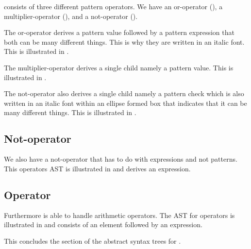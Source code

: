 \productname{} consists of three different pattern operators. We have an or-operator (), a multiplier-operator (), and a not-operator (). 

The or-operator derives a pattern value followed by a pattern expression that both can be many different things. This is why they are written in an italic font. This is illustrated in .



The multiplier-operator derives a single child namely a pattern value. This is illustrated in .



The not-operator also derives a single child namely a pattern check which is also written in an italic font within an ellipse formed box that indicates that it can be many different things. This is illustrated in .



\subsection{Not-operator}

We also have a not-operator that has to do with expressions and not patterns. This operators AST is illustrated in  and derives an expression.



\subsection{Operator}

Furthermore \productname{} is able to handle arithmetic operators. The AST for operators is illustrated in  and consists of an element followed by an expression.



This concludes the section of the abstract syntax trees for \productname{}.